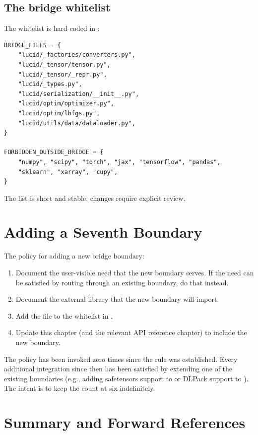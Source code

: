 \subsection{The bridge whitelist}
\label{ssec:bridge_boundaries:whitelist}

The whitelist is hard-coded in :

\begin{lstlisting}[style=lucid,language=LucidPython]
BRIDGE_FILES = {
    "lucid/_factories/converters.py",
    "lucid/_tensor/tensor.py",
    "lucid/_tensor/_repr.py",
    "lucid/_types.py",
    "lucid/serialization/__init__.py",
    "lucid/optim/optimizer.py",
    "lucid/optim/lbfgs.py",
    "lucid/utils/data/dataloader.py",
}

FORBIDDEN_OUTSIDE_BRIDGE = {
    "numpy", "scipy", "torch", "jax", "tensorflow", "pandas",
    "sklearn", "xarray", "cupy",
}
\end{lstlisting}

The list is short and stable; changes require explicit review.

\section{Adding a Seventh Boundary}
\label{sec:bridge_boundaries:adding}

The policy for adding a new bridge boundary:

\begin{enumerate}
  \item Document the user-visible need that the new boundary
    serves. If the need can be satisfied by routing through an
    existing boundary, do that instead.
  \item Document the external library that the new boundary will
    import.
  \item Add the file to the whitelist in
    .
  \item Update this chapter (and the relevant API reference
    chapter) to include the new boundary.
\end{enumerate}

The policy has been invoked zero times since the rule was
established. Every additional integration since then has been
satisfied by extending one of the existing boundaries (e.g.,
adding safetensors support to  or DLPack
support to ). The intent is to keep the count
at six indefinitely.

\section{Summary and Forward References}
\label{sec:bridge_boundaries:summary}

